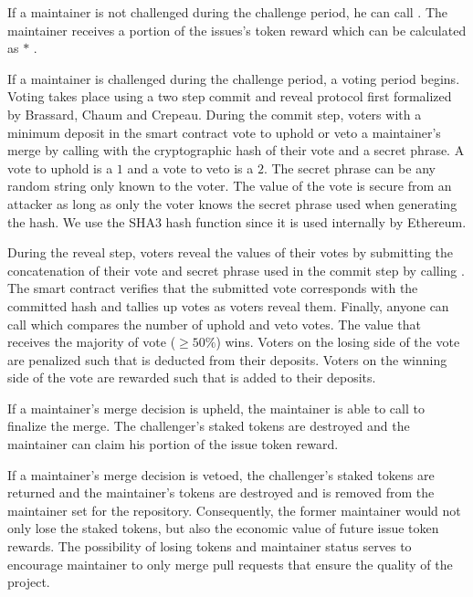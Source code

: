 If a maintainer is not challenged during the challenge period, he can call
. The maintainer receives a portion of the
issues's token reward which can be calculated as  $*$ .

If a maintainer is challenged during the challenge period, a voting
period begins. Voting takes place using a two step commit and reveal protocol
first formalized by Brassard, Chaum and Crepeau\cite{proofsofknowledge}. During
the commit step, voters with a minimum  deposit in the
smart contract vote to uphold or veto a maintainer's merge by calling
 with the cryptographic hash of their vote and a secret
phrase. A vote to uphold is a $1$ and a vote to veto is a $2$. The secret phrase
can be any random string only known to the voter. The value of the vote is
secure from an attacker as long as only the voter knows the secret phrase used
when generating the hash. We use the SHA3  hash function
since it is used internally by Ethereum.

During the reveal step, voters reveal the values of their votes by submitting
the concatenation of their vote and secret phrase used in the commit step by
calling . The smart contract verifies that the
submitted vote corresponds with the committed hash and tallies up votes as
voters reveal them. Finally, anyone can call  which
compares the number of uphold and veto votes. The value that receives the
majority of vote ($\geq 50\%$) wins. Voters on the losing side of the vote are
penalized such that  is deducted from their
deposits. Voters on the winning side of the vote are rewarded such that
 is added to their deposits.

If a maintainer's merge decision is upheld, the maintainer is able to call
 to finalize the merge. The challenger's
 staked tokens are destroyed and the maintainer can
claim his portion of the issue token reward.

If a maintainer's merge decision is vetoed, the challenger's staked tokens are
returned and the maintainer's  tokens are destroyed and is removed from the maintainer set for the
repository. Consequently, the former maintainer would not only lose the staked
tokens, but also the economic value of future issue token rewards. The
possibility of losing tokens and maintainer status serves to encourage
maintainer to only merge pull requests that ensure the quality of the project.

